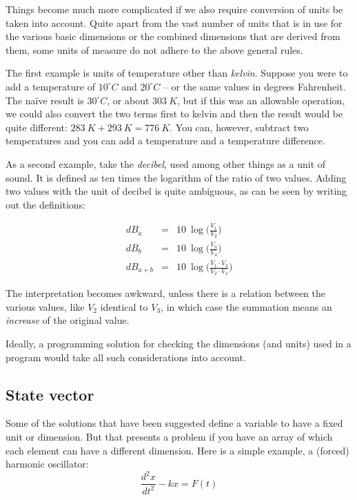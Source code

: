 \documentclass{article}
\begin{document}
Things become much more complicated if we also require conversion of units be taken into account. Quite apart from
the vast number of units that is in use for the various basic dimensions or the combined dimensions that are derived
from them, some units of measure do not adhere to the above general rules.

The first example is units of temperature other than \emph{kelvin}. Suppose you were to add a temperature of $10 ^\circ C$
and $20 ^\circ C$ -- or the same values in degrees Fahrenheit. The na\"ive result is $30 ^\circ C$, or about $303~K$, but if this was an
allowable operation, we could also convert the two terms first to kelvin and then the result would be quite different:
$ 283~K + 293~K = 776~K$. You can, however, subtract two temperatures and you can add a temperature and a temperature difference.

As a second example, take the \emph{decibel}, used among other things as a unit of sound. It is defined as ten times the
logarithm of the ratio of two values. Adding two values with the unit of decibel is quite ambiguous, as can be seen
by writing out the definitions:

\begin{eqnarray}
   dB_{a}   &=& 10 ~ \log \bigl ( \frac{V_1}{V_2} \bigr ) \\
   dB_{b}   &=& 10 ~ \log \bigl ( \frac{V_3}{V_4} \bigr ) \\
   dB_{a+b} &=& 10 ~ \log \bigl ( \frac{V_1 \cdot V_3}{V_2 \cdot V_4} \bigr )
\end{eqnarray}

The interpretation becomes awkward, unless there is a relation between the various values, like $V_2$ identical to $V_3$, in
which case the summation means an \emph{increase} of the original value.

Ideally, a programming solution for checking the dimensions (and units) used in a program would take all such considerations
into account.

\subsection*{State vector}
Some of the solutions that have been suggested define a variable to have a fixed unit or dimension. But that presents
a problem if you have an array of which each element can have a different dimension. Here is a simple example,
a (forced) harmonic oscillator:
\begin{equation}
    \frac{d^2 x}{dt^2} - kx = F(t)
\end{equation}
\end{document}
